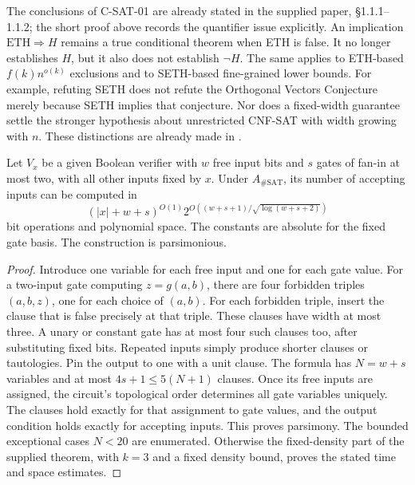 The conclusions of C-SAT-01 are already stated in the supplied paper,
\S1.1.1--1.1.2; the short proof above records the quantifier issue explicitly.
An implication \(\mathrm{ETH}\Rightarrow H\) remains a true conditional
theorem when ETH is false.  It no longer establishes \(H\), but it also
does not establish \(\neg H\).  The same applies to ETH-based
\(f(k)n^{o(k)}\) exclusions and to SETH-based fine-grained lower bounds.
For example, refuting SETH does not refute the Orthogonal Vectors
Conjecture merely because SETH implies that conjecture.  Nor does a
fixed-width guarantee settle the stronger hypothesis about unrestricted
CNF-SAT with width growing with \(n\).  These distinctions are already
made in \cite[\S1.1.3]{COAI26}.

\begin{proposition}
Let \(V_x\) be a given Boolean verifier with \(w\) free input bits and
\(s\) gates of fan-in at most two, with all other inputs fixed by \(x\).
Under \(A_{\#\mathrm{SAT}}\), its number of accepting inputs can be computed
in
\[
 (|x|+w+s)^{O(1)}
 2^{O((w+s+1)/\sqrt{\log(w+s+2)})}
\]
bit operations and polynomial space.  The constants are absolute for
the fixed gate basis.  The construction is parsimonious.
\end{proposition}
\begin{proof}
Introduce one variable for each free input and one for each gate value.
For a two-input gate computing \(z=g(a,b)\), there are four forbidden
triples \((a,b,z)\), one for each choice of \((a,b)\).  For each forbidden
triple, insert the clause that is false precisely at that triple.
These clauses have width at most three.  A unary or constant gate has
at most four such clauses too, after substituting fixed bits.  Repeated
inputs simply produce shorter clauses or tautologies.  Pin the output
to one with a unit clause.  The formula has \(N=w+s\) variables and
at most \(4s+1\le5(N+1)\) clauses.  Once its free inputs are assigned,
the circuit's topological order determines all gate variables uniquely.
The clauses hold exactly for that assignment to gate values, and the
output condition holds exactly for accepting inputs.  This proves
parsimony.  The bounded exceptional cases \(N<20\) are enumerated.
Otherwise the fixed-density part of the supplied theorem, with \(k=3\)
and a fixed density bound, proves the stated time and space estimates.
\end{proof}

